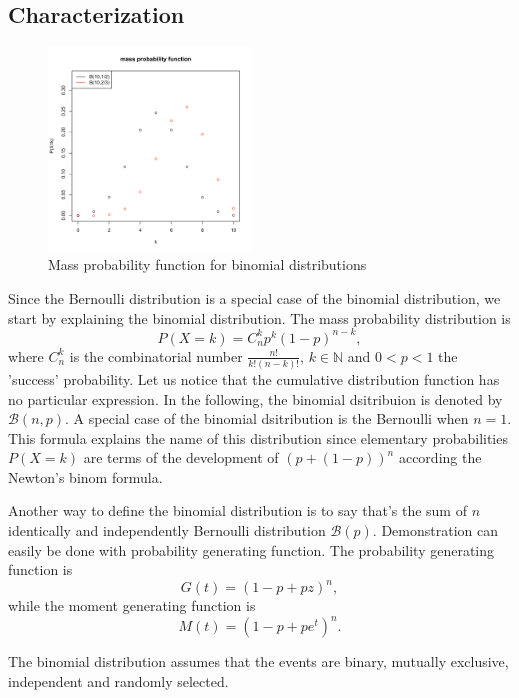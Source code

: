\subsection{Characterization}
\begin{figure}
  \vspace{-20pt}
  \begin{center}
    \includegraphics[width=0.48\textwidth]{img/binomzoom}
  \end{center}
  \vspace{-20pt}  
  \caption{Mass probability function for binomial distributions}
  \vspace{-20pt}  
\end{figure}


Since the Bernoulli distribution is a special case of the binomial distribution, we start by explaining the binomial distribution. The mass probability distribution is 
$$
P(X=k) = C_n^k p^k(1-p)^{n-k},
$$
where $C_n^k$ is the combinatorial number $\frac{n!}{k!(n-k)!}$, $k\in \mathbb N$ and $0<p<1$ the 'success' probability. Let us notice that the cumulative distribution function has no particular expression. In the following, the binomial dsitribuion
is denoted by $\mathcal B(n,p)$. A special case of the binomial dsitribution is the Bernoulli when $n=1$.
This formula explains the name of this distribution since elementary probabilities $P(X=k)$ are terms
of the development of $(p+(1-p))^n$ according the Newton's binom formula.

Another way to define the binomial distribution is to say that's the sum of $n$ identically and independently Bernoulli distribution $\mathcal B(p)$. Demonstration can easily be done with probability generating function.
The probability generating function is
$$
G(t) = (1-p+pz)^n,
$$
while the moment generating function is
$$
M(t) = (1-p+pe^t)^n.
$$

The binomial distribution assumes that the events are binary, mutually exclusive, independent and randomly selected.


